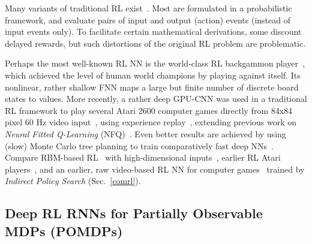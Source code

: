 \documentclass[letterpaper]{article}
\begin{document}
\begin{sloppypar}
Many variants of traditional RL exist~\citep[e.g.,][]{BartoSuttonAnderson:83,Watkins:89,WatkinsDayan:92,Moore:93,Schwartz:93,Rummery:94,Singh:94R,Baird:95,Kaelbling:95,Peng:96,Mahadevan:96,Tsitsiklis:96,96-BradtkeLstd,Santamaria:97,prwu97,Sutton:98,Wiering:98,baird:nips12,meuleau:icuai99,Doya:00,Bertsekas:01,brafman02,Abounadi:02,03-LspiLagoudakis,09-Gtd,10-GqLambda,hasselt2012}.
Most are formulated in a probabilistic framework,
and evaluate pairs of input and output (action) events (instead of input events only).
To facilitate certain mathematical derivations,
some discount delayed rewards,
but such distortions of the original RL problem are problematic.

Perhaps the most well-known RL NN is the  world-class RL backgammon player~\citep{Tesauro:94},
which achieved the level of human world champions by playing against itself.
Its nonlinear, rather shallow FNN maps a large but finite
number of discrete board states to values.   
More recently, a rather deep GPU-CNN  was used in
a traditional RL framework  to play several Atari 2600 computer games directly from 
84x84 pixel 60 Hz video input~\citep{atari2013},
using experience replay~\citep{Lin:93},
extending previous work on {\em Neural Fitted Q-Learning} (NFQ)~\citep{nfq}.
Even better results are achieved by using (slow) Monte Carlo tree planning to
train comparatively fast deep NNs~\citep{atarimcts2014}.
Compare RBM-based RL~\citep{sallans2004} with high-dimensional inputs~\citep{elfwing2010},
earlier RL Atari players~\citep{gruettner2010multi},
and an earlier, raw video-based RL NN for computer games~\citep{koutnik:gecco13} trained by {\em Indirect Policy Search}
(Sec.~\ref{comrl}). 


\subsection{Deep RL RNNs for Partially Observable MDPs (POMDPs)}
\label{pomrl}


\end{sloppypar}
\end{document}
